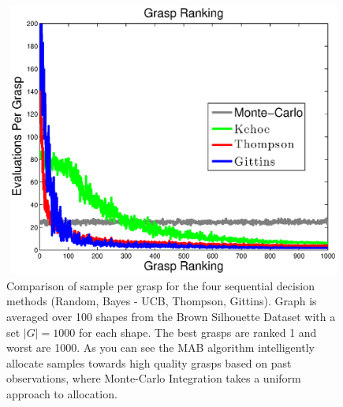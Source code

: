 \documentclass[journal,transmag]{IEEEtran}%
\begin{document}
\begin{figure}[ht!]
\centering
\includegraphics[width = 16.5cm, height = 9cm]{matlab_figures/pulls_per_grasp.eps}
\caption{ \footnotesize Comparison of sample per grasp for the four sequential decision methods (Random, Bayes - UCB, Thompson, Gittins). Graph is averaged over 100 shapes from the Brown Silhouette Dataset \cite{brown} with a set $|G|=1000$ for each shape. The best grasps are ranked 1 and worst are 1000. As you can see the MAB algorithm intelligently allocate samples towards high quality grasps based on past observations, where Monte-Carlo Integration takes a uniform approach to allocation. \cite{best_arm}}
\vspace*{-10pt}
\label{fig:pulls_per_grasp}
\end{figure}
\end{document}
